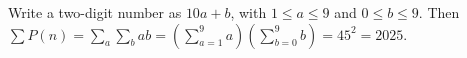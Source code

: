 Write a two-digit number as $10a+b$, with $1\le a\le 9$ and $0\le b\le 9$. Then $\sum P(n)=\sum_a\sum_b ab=(\sum_{a=1}^9a)(\sum_{b=0}^9b)=45^2=\boxed{2025}$.
